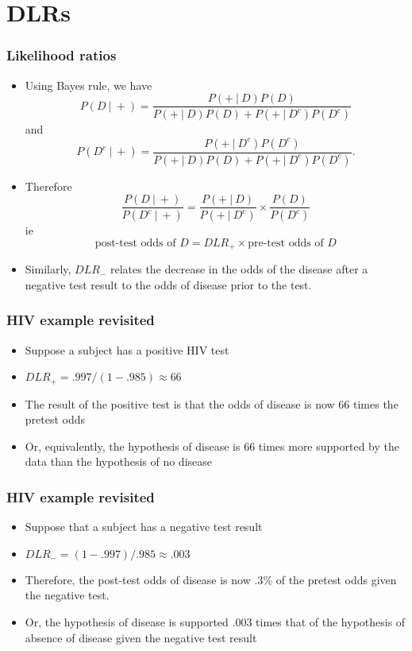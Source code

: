 \documentclass[aspectratio=169]{beamer}
\begin{document}
\section{DLRs}
\begin{frame}\frametitle{Likelihood ratios}
\begin{itemize}
\item Using Bayes rule, we have
  $$
  P(D ~|~ +) = \frac{P(+~|~D)P(D)}{P(+~|~D)P(D) + P(+~|~D^c)P(D^c)} 
  $$
  and
  $$
  P(D^c ~|~ +) = \frac{P(+~|~D^c)P(D^c)}{P(+~|~D)P(D) + P(+~|~D^c)P(D^c)}.
  $$
\item Therefore
$$
\frac{P(D ~|~ +)}{P(D^c ~|~ +)} = \frac{P(+~|~D)}{P(+~|~D^c)}\times \frac{P(D)}{P(D^c)}
$$
ie
$$
\mbox{post-test odds of }D = DLR_+\times\mbox{pre-test odds of }D
$$
\item Similarly, $DLR_-$ relates the decrease in the odds of the
  disease after a negative test result to the odds of disease prior to
  the test.
\end{itemize}
\end{frame}

\begin{frame}\frametitle{HIV example revisited}
\begin{itemize}
\item Suppose a subject has a positive HIV test
\item $DLR_+ = .997 / (1 - .985) \approx 66$
\item The result of the positive test is that the odds of disease is
  now 66 times the pretest odds
\item Or, equivalently, the hypothesis of disease is 66 times more
  supported by the data than the hypothesis of no disease
\end{itemize}
\end{frame}

\begin{frame}\frametitle{HIV example revisited}
\begin{itemize}
\item Suppose that a subject has a negative test result 
\item $DLR_- = (1 - .997) / .985  \approx .003$
\item Therefore, the post-test odds of disease is now $.3\%$ of the pretest
  odds given the negative test.
\item Or, the hypothesis of disease is supported $.003$ times that of
  the hypothesis of absence of disease given the negative test result
\end{itemize}
\end{frame}
\end{document}
